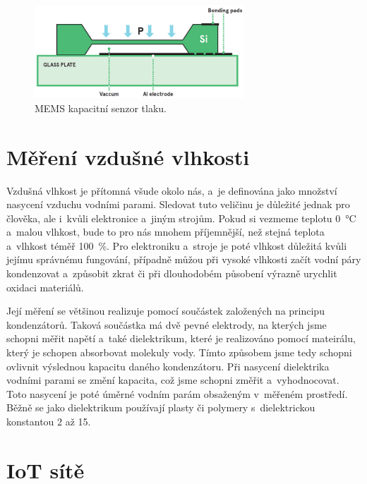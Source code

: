 \begin{figure}
    \centering
    \includegraphics[width=0.7\textwidth]{obrazky/MEMS_capacitive_sensor.jpg}
    \caption{MEMS kapacitní senzor tlaku. \cite{AvnetMEMS}}
    \label{fig_memsCapacitiveSensor}
\end{figure}

\section{Měření vzdušné vlhkosti}

Vzdušná vlhkost je přítomná všude okolo nás, a~je definována jako množství nasycení vzduchu vodními parami. Sledovat tuto veličinu je důležité jednak pro člověka, ale i~kvůli elektronice a~jiným strojům. Pokud si vezmeme teplotu \SI{0}{\celsius} a~malou vlhkost, bude to pro nás mnohem příjemnější, než stejná teplota a~vlhkost téměř \SI{100}{\percent}. Pro elektroniku a~stroje je poté vlhkost důležitá kvůli jejímu správnému fungování, případně můžou při vysoké vlhkosti začít vodní páry kondenzovat a~způsobit zkrat či při dlouhodobém působení výrazně urychlit oxidaci materiálů.

Její měření se většinou realizuje pomocí součástek založených na principu kondenzátorů. Taková součástka má dvě pevné elektrody, na kterých jsme schopni měřit napětí a~také dielektrikum, které je realizováno pomocí mateirálu, který je schopen absorbovat molekuly vody. Tímto způsobem jsme tedy schopni ovlivnit výslednou kapacitu daného kondenzátoru. Při nasycení dielektrika vodními parami se změní kapacita, což jsme schopni změřit a~vyhodnocovat. Toto nasycení je poté úměrné vodním parám obsaženým v~měřeném prostředí. Běžně se jako dielektrikum používají plasty či polymery s~dielektrickou konstantou 2 až 15.

\section{IoT sítě}

